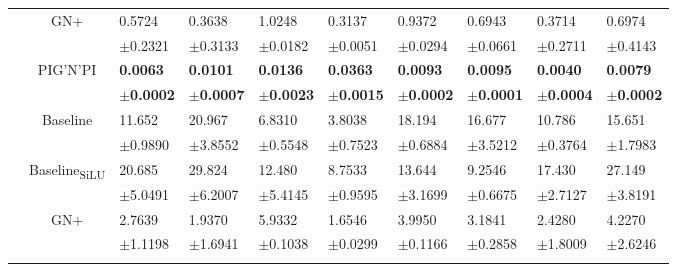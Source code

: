 \documentclass{article}
\newcommand{\pignpi}{PIG'N'PI\xspace}
\newcommand{\lemos}{GN+\xspace}
\begin{document}
\begin{table}[h!]
{\begin{tabularx}{\textwidth}{ccXXXXXXXX}
        &\multirow{2}{*}{\lemos}
        &0.5724 & 0.3638 & 1.0248 & 0.3137 & 0.9372 & 0.6943 & 0.3714 & 0.6974\\
        &&\scriptsize$\pm$0.2321&\scriptsize$\pm$0.3133&\scriptsize$\pm$0.0182&\scriptsize$\pm$0.0051&\scriptsize$\pm$0.0294&\scriptsize$\pm$0.0661&\scriptsize$\pm$0.2711&\scriptsize$\pm$0.4143\\
        \cline{3-10}\rule{0pt}{2.3ex}

        &\multirow{2}{*}{\pignpi}
        &\textbf{0.0063} & \textbf{0.0101} & \textbf{0.0136} & \textbf{0.0363} & \textbf{0.0093} & \textbf{0.0095} & \textbf{0.0040} & \textbf{0.0079}\\
        &&\scriptsize\textbf{$\pm$0.0002} & \scriptsize \textbf{$\pm$0.0007} & \scriptsize \textbf{$\pm$0.0023} & \scriptsize \textbf{$\pm$0.0015} & \scriptsize \textbf{$\pm$0.0002} & \scriptsize \textbf{$\pm$0.0001} & \scriptsize \textbf{$\pm$0.0004} & \scriptsize \textbf{$\pm$0.0002}\\
        \hline\rule{0pt}{2.3ex}
        
        \multirow{8}{*}{\textsf{MAE\textsubscript{nf}}}
        &\multirow{2}{*}{Baseline}
        &11.652 & 20.967 & 6.8310 & 3.8038 & 18.194 & 16.677 & 10.786 & 15.651\\
        &&\scriptsize$\pm$0.9890 & \scriptsize $\pm$3.8552 & \scriptsize $\pm$0.5548 & \scriptsize $\pm$0.7523 & \scriptsize $\pm$0.6884 & \scriptsize $\pm$3.5212 & \scriptsize $\pm$0.3764 & \scriptsize $\pm$1.7983\\
        \cline{3-10}\rule{0pt}{2.3ex}

        &\multirow{2}{*}{{Baseline\textsubscript{SiLU}}}
        &20.685 & 29.824 & 12.480 & 8.7533 & 13.644 & 9.2546 & 17.430 & 27.149\\
        &&\scriptsize$\pm$5.0491 & \scriptsize $\pm$6.2007 & \scriptsize $\pm$5.4145 & \scriptsize $\pm$0.9595 & \scriptsize $\pm$3.1699 & \scriptsize $\pm$0.6675 & \scriptsize $\pm$2.7127 & \scriptsize $\pm$3.8191\\
        \cline{3-10}\rule{0pt}{2.3ex}
        
        &\multirow{2}{*}{\lemos}
        & 2.7639 & 1.9370 & 5.9332 & 1.6546 & 3.9950 & 3.1841 & 2.4280 & 4.2270\\
        &&\scriptsize$\pm$1.1198&\scriptsize$\pm$1.6941&\scriptsize$\pm$0.1038&\scriptsize$\pm$0.0299&\scriptsize$\pm$0.1166&\scriptsize$\pm$0.2858&\scriptsize$\pm$1.8009&\scriptsize$\pm$2.6246\\
        \cline{3-10}\rule{0pt}{2.3ex}


\end{tabularx}}
\end{table}
\end{document}
